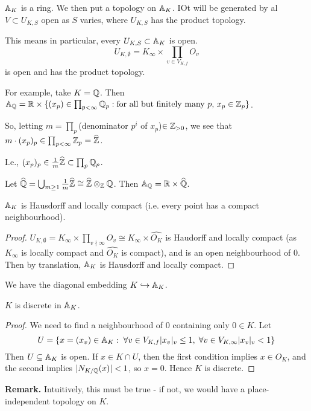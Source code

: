 \documentclass[10pt,a4paper]{article}
\begin{document}
$\mathbb{A}_K$ is a ring. We then put a topology on $\mathbb{A}_K$. IOt will be generated by al $V \subset U_{K,S}$ open as $S$ varies, where $U_{K,S}$ has the product topology.

This means in particular, every $U_{K,S} \subset \mathbb{A}_K$ is open.
\[U_{K, \emptyset} = K_\infty \times \prod_{v \in V_{K,f}}O_v\]
is open and has the product topology.

For example, take $K=\mathbb{Q}$. Then $\mathbb{A}_{\mathbb{Q}} = \mathbb{R} \times \{(x_p) \in \prod_{\mathfrak{p} < \infty}\mathbb{Q}_p:\text{for all but finitely many $p$, $x_p \in \mathbb{Z}_p$}\}$.

So, letting $m = \prod_p$(denominator $p^i$ of $x_p$)$\in \mathbb{Z}_{>0}$, we see that $m\cdot (x_p)_p \in \prod_{p <\infty} \mathbb{Z}_p = \widehat{\mathbb{Z}}$.

I.e., $(x_p)_p \in \frac{1}{m}\widehat{\mathbb{Z}} \subset \prod_p \mathbb{Q}_p$.

Let $\widehat{\mathbb{Q}} = \bigcup_{m\geq 1}\frac{1}{m}\widehat{\mathbb{Z}} \cong \widehat{\mathbb{Z}}\otimes_{\mathbb{Z}} \mathbb{Q}$. Then $\mathbb{A}_{\mathbb{Q}} = \mathbb{R} \times \widehat{\mathbb{Q}}$.
\begin{proposition}
  $\mathbb{A}_K$ is Hausdorff and locally compact (i.e. every point has a compact neighbourhood).
\end{proposition}
\begin{proof}
  $U_{K, \emptyset} = K_\infty \times \prod_{v\nmid\infty}O_v \cong K_\infty \times \hat{O_K}$ is Haudorff and locally compact (as $K_\infty$ is locally compact and $\hat{O_K}$ is compact), and is an open neighbourhood of 0. Then by translation, $\mathbb{A}_K$ is Hausdorff and locally compact.
\end{proof}
We have the diagonal embedding $K \hookrightarrow \mathbb{A}_K$.
\begin{proposition}
  $K$ is discrete in $\mathbb{A}_K$.
\end{proposition}
\begin{proof}
  We need to find a neighbourhood of $0$ containing only $0 \in K$. Let
  \[U = \{x = (x_v) \in \A_K : \forall v \in V_{K,f} |x_v|_v\leq 1, \forall v \in V_{K, \infty} |x_v|_v <1\}\]
  Then $U \subseteq \mathbb{A}_K$ is open. If $x \in K \cap U$, then the first condition implies $x \in O_K$, and the second implies $|N_{K/\mathbb{Q}}(x)| < 1$, so $x=0$. Hence $K$ is discrete.
\end{proof}
\textbf{Remark.} Intuitively, this must be true - if not, we would have a place-independent topology on $K$.
\end{document}

